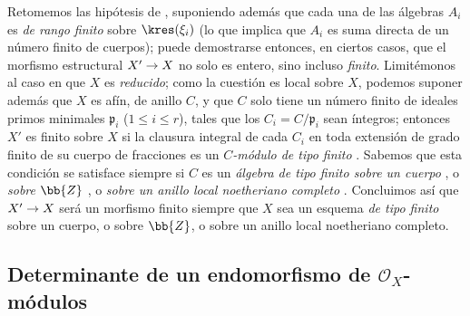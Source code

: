 \documentclass[oneside,10pt]{amsart}
\makeatletter
\renewcommand{\leq}{\leqslant}
\newcommand{\ega@arrow}[2]{\mathchoice{#1}{#2}{#2}{#2}}
\renewcommand{\to}{\ega@arrow{\longrightarrow}{\rightarrow}}
\let\EGAOriginalLabel\label
\renewcommand{\label}[1]{\phantomsection\EGAOriginalLabel{#1}}
\makeatother
\begin{document}
\begin{remark}[6.3.10]
\label{II.6.3.10}
Retomemos las hipótesis de , suponiendo además que cada una de las álgebras $A_i$ es \emph{de rango finito} sobre $\kres(\xi_i)$ (lo que implica que $A_i$ es suma directa de un número finito de cuerpos);
puede demostrarse entonces, en ciertos casos, que el morfismo estructural $X'\to X$ no solo es entero, sino incluso \emph{finito}.
Limitémonos al caso en que $X$ es \emph{reducido};
como la cuestión es local sobre $X$, podemos suponer además que $X$ es afín, de anillo $C$, y que $C$ solo tiene un número finito de ideales primos minimales $\mathfrak{p}_i$ ($1\leq i\leq r$), tales que los $C_i=C/\mathfrak{p}_i$ sean íntegros;
entonces $X'$ es finito sobre $X$ si la clausura integral de cada $C_i$ en toda extensión de grado finito de su cuerpo de fracciones es un \emph{$C$-módulo de tipo finito} .
Sabemos que esta condición se satisface siempre si $C$ es un \emph{álgebra de tipo finito sobre un cuerpo} \cite[t.~I, p.~267, th.~9]{I-13}, o \emph{sobre $\bb{Z}$} \cite[I,p.~93, th.~3]{I-9}, o \emph{sobre un anillo local noetheriano completo} \cite[p.~298]{II-25}.
Concluimos así que $X'\to X$ será un morfismo finito siempre que $X$ sea un esquema \emph{de tipo finito} sobre un cuerpo, o sobre $\bb{Z}$, o sobre un anillo local noetheriano completo.
\end{remark}

\subsection{Determinante de un endomorfismo de $\mathcal{O}_X$-módulos}
\label{subsection:II.6.4}
\end{document}
